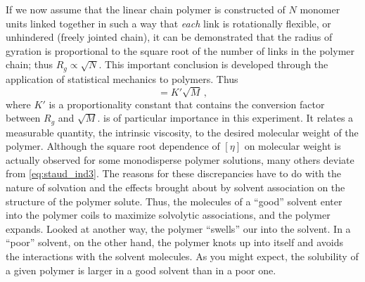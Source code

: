 \documentclass[nobib,nofonts,nols,nohyper]{tufte-handout}
\begin{document}
If we now assume that the linear chain polymer is constructed of \( N \) monomer units linked together in such a way that \emph{each} link is rotationally flexible, or unhindered (freely jointed chain), it can be demonstrated that the radius of gyration is proportional to the square root of the number of links in the polymer chain; thus \( R_g \propto \sqrt{N} \). 
This important conclusion is developed through the application of statistical mechanics to polymers.\cite{halpern97} Thus
\begin{equation}
	[\eta] = K' \sqrt{M} \, ,
	\label{eq:staud_ind3}
\end{equation}
where \( K' \) is a proportionality constant that contains the conversion factor between \( R_g \) and \( \sqrt{M} \). 
 is of particular importance in this experiment. 
It relates a measurable quantity, the intrinsic viscosity, to the desired molecular weight of the polymer. Although the square root dependence of \( [\eta] \) on molecular weight is actually observed for some monodisperse polymer solutions, many others deviate from \cref{eq:staud_ind3}. 
The reasons for these discrepancies have to do with the nature of solvation and the effects brought about by solvent association on the structure of the polymer solute. 
Thus, the molecules of a ``good'' solvent enter into the polymer coils to maximize solvolytic associations, and the polymer expands. 
Looked at another way, the polymer ``swells'' our into the solvent. 
In a ``poor'' solvent, on the other hand, the polymer knots up into itself and avoids the interactions with the solvent molecules. 
As you might expect, the solubility of a given polymer is larger in a good solvent than in a poor one. 
\end{document}
